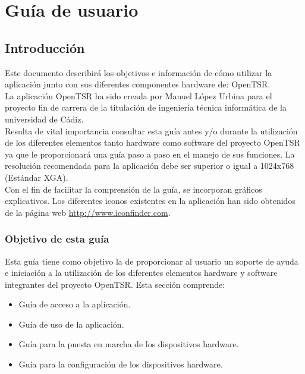 

\chapter{Guía de usuario}
\label{chap:manual-usuario}

\section{Introducción}

Este documento describirá los objetivos e información de cómo utilizar la aplicación junto con sus diferentes componentes hardware de: OpenTSR.\\

La aplicación OpenTSR ha sido creada por Manuel López Urbina para el proyecto fin de carrera de la titulación de ingeniería técnica informática de la universidad de Cádiz.\\

Resulta de vital importancia consultar esta guía antes y/o durante la utilización de los diferentes elementos tanto hardware como software del proyecto OpenTSR ya que le proporcionará una guía paso a paso en el manejo de sus funciones. La resolución recomendada para la aplicación debe ser superior o igual a 1024x768 (Estándar XGA).\\

Con el fin de facilitar la comprensión de la guía, se incorporan gráficos explicativos. Los diferentes iconos existentes en la aplicación han sido obtenidos de la página web \url{http://www.iconfinder.com}.

\subsection{Objetivo de esta guía}

Esta guía tiene como objetivo la de proporcionar al usuario un soporte de ayuda e iniciación a la utilización de los diferentes elementos hardware y software integrantes del proyecto OpenTSR. Esta sección comprende:

\begin{itemize}
\item Guía de acceso a la aplicación.
\item Guía de uso de la aplicación.
\item Guía para la puesta en marcha de los dispositivos hardware.
\item Guía para la configuración de los dispositivos hardware.
\end{itemize}

